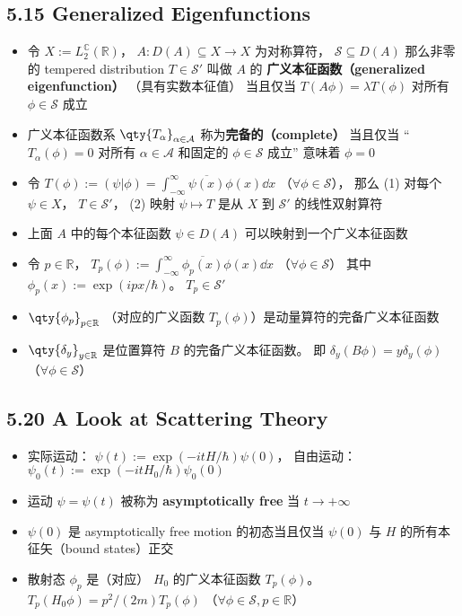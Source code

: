 \subsection{5.15 Generalized Eigenfunctions}
\begin{itemize}
\item 令 $X := L_2^{\mathbb C}(\mathbb R)$， $A:D(A) \subseteq X\to X$ 为对称算符， $\mathcal S\subseteq D(A)$ 那么非零的 tempered distribution $T \in\mathcal S'$ 叫做 $A$ 的 \textbf{广义本征函数（generalized eigenfunction）} （具有实数本征值） 当且仅当 $T(A\phi) = \lambda T(\phi)$ 对所有 $\phi\in\mathcal S$ 成立

\item 广义本征函数系 $\qty{T_\alpha}_{\alpha\in\mathcal A}$ 称为\textbf{完备的（complete）} 当且仅当 “$T_\alpha(\phi) = 0$ 对所有 $\alpha\in\mathcal A$ 和固定的 $\phi\in\mathcal S$ 成立” 意味着 $\phi = 0$

\item 令 $T(\phi) := (\psi|\phi) = \int_{-\infty}^\infty \overline{\psi(x)} \phi(x) \dd{x}$ （$\forall \phi\in\mathcal S$）， 那么 (1) 对每个 $\psi\in X$， $T\in\mathcal S'$， (2) 映射 $\psi\mapsto T$ 是从 $X$ 到 $\mathcal S'$ 的线性双射算符

\item 上面 $A$ 中的每个本征函数 $\psi\in D(A)$ 可以映射到一个广义本征函数

\item 令 $p\in\mathbb R$， $T_p(\phi) := \int_{-\infty}^\infty \overline{\phi_p(x)}\phi(x) \dd{x}$ （$\forall \phi\in\mathcal S$） 其中 $\phi_p(x) := \exp(ipx/\hbar)$。 $T_p \in \mathcal S'$

\item $\qty{\phi_p}_{p\in\mathbb R}$ （对应的广义函数 $T_p(\phi)$）是动量算符的完备广义本征函数

\item $\qty{\delta_y}_{y\in\mathbb R}$ 是位置算符 $B$ 的完备广义本征函数。 即 $\delta_y(B\phi) = y\delta_y(\phi)$ （$\forall \phi\in\mathcal S$）
\end{itemize}

\subsection{5.20 A Look at Scattering Theory}
\begin{itemize}
\item 实际运动： $\psi(t) := \exp(-itH/\hbar)\psi(0)$， 自由运动： $\psi_0(t) := \exp(-itH_0/\hbar)\psi_0(0)$
\item 运动 $\psi = \psi(t)$ 被称为 \textbf{asymptotically free} 当 $t\to+\infty$

\item $\psi(0)$ 是 asymptotically free motion 的初态当且仅当 $\psi(0)$ 与 $H$ 的所有本征矢（bound states）正交

\item 散射态 $\phi_p$ 是（对应） $H_0$ 的广义本征函数 $T_p(\phi)$。 $T_p(H_0 \phi) = p^2/(2m) T_p(\phi)$ （$\forall \phi\in\mathcal S, p\in\mathbb R$）
\end{itemize}


